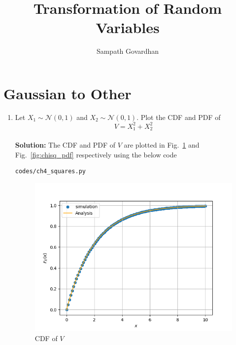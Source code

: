 \documentclass[journal,10pt,twocolumn]{article}
\newcommand\figref{Fig.~\ref}
\newcommand{\solution}{\noindent \textbf{Solution: }}
\providecommand{\gauss}[2]{\mathcal{N}\ensuremath{\left(#1,#2\right)}}
\begin{document}
\title{Transformation of Random Variables}
\author{Sampath Govardhan}

\maketitle

\tableofcontents

\bigskip

\fi

\section{Gaussian to Other}

\begin{enumerate}

\item
Let $X_1 \sim  \gauss{0}{1}$ and $X_2 \sim  \gauss{0}{1}$. Plot the CDF and PDF of
%
\begin{equation}
V = X_1^2 + X_2^2
\end{equation}\\
\solution The CDF and PDF of $V$ are plotted in \figref{fig:chisq_cdf} and \figref{fig:chisq_pdf} respectively using the below code
\begin{lstlisting}
codes/ch4_squares.py
\end{lstlisting}
\begin{figure}[h]
\centering
\includegraphics[width=\columnwidth]{./chapters/ch4/figs/ch4_squarescdf.png}
\caption{CDF of $V$}
\label{fig:chisq_cdf}
\end{figure}
\begin{figure}[h]

\end{figure}
\end{enumerate}
\end{document}

